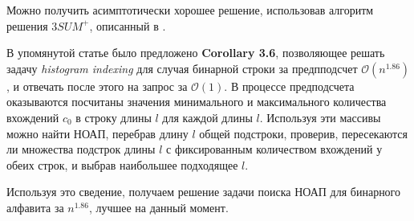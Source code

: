 Можно получить асимптотически хорошее решение, использовав алгоритм решения $3SUM^+$, описанный в \cite{2}. 

В упомянутой статье было предложено \textbf{Corollary 3.6}, позволяющее решать задачу \textit{histogram indexing} для случая бинарной строки за предпподсчет $\mathcal{O}(n^{1.86})$, и отвечать после этого на запрос за $\mathcal{O}(1)$. В процессе предподсчета оказываются посчитаны значения минимального и максимального количества вхождений $c_0$ в строку длины $l$ для каждой длины $l$. Используя эти массивы можно найти НОАП, перебрав длину $l$ общей подстроки, проверив, пересекаются ли множества подстрок длины $l$ с фиксированным количеством вхождений у обеих строк, и выбрав наибольшее подходящее $l$.

Используя это сведение, получаем решение задачи поиска НОАП для бинарного алфавита за $n^{1.86}$, лучшее на данный момент.
